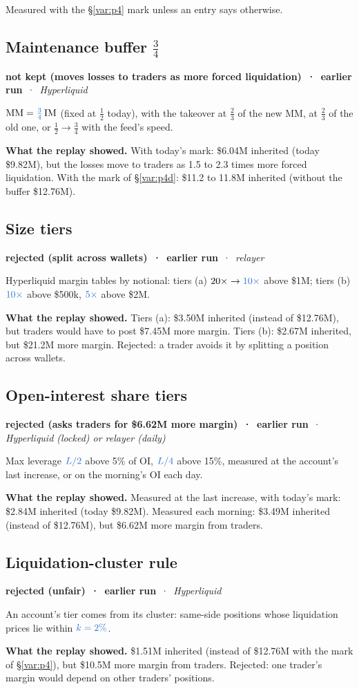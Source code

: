 \documentclass[10.5pt,a4paper]{article}
\newcommand{\chg}[1]{\ensuremath{{\color[HTML]{2F74D0}#1}}}
\newcommand{\st}[3]{\textcolor{#1}{\textbf{#2}} \,·\, \emph{#3}\par}
\newcommand{\res}[1]{\par\textbf{What the replay showed.} #1\par}
\begin{document}
Measured with the \S\ref{var:p4} mark unless an entry says otherwise.

\subsection{Maintenance buffer \texorpdfstring{$\tfrac34$}{3/4}}\label{var:auto7}
\st{sup}{not kept (moves losses to traders as more forced liquidation) \,·\, earlier run}{Hyperliquid}
$\text{MM} = \chg{\tfrac34}\,\text{IM}$ (fixed at $\tfrac12$ today), with the takeover at $\tfrac23$ of the new MM, at $\tfrac23$ of the old one, or $\tfrac12 \to \tfrac34$ with the feed's speed.
\res{With today's mark: \$6.04M inherited (today \$9.82M), but the losses move to traders as 1.5 to 2.3 times more forced liquidation. With the mark of \S\ref{var:p4d}: \$11.2 to 11.8M inherited (without the buffer \$12.76M).}

\subsection{Size tiers}\label{var:auto8}
\st{rej}{rejected (split across wallets) \,·\, earlier run}{relayer}
Hyperliquid margin tables by notional: tiers (a) $20\times \to \chg{10\times}$ above \$1M; tiers (b) $\chg{10\times}$ above \$500k, $\chg{5\times}$ above \$2M.
\res{Tiers (a): \$3.50M inherited (instead of \$12.76M), but traders would have to post \$7.45M more margin. Tiers (b): \$2.67M inherited, but \$21.2M more margin. Rejected: a trader avoids it by splitting a position across wallets.}

\subsection{Open-interest share tiers}\label{var:auto9}
\st{rej}{rejected (asks traders for \$6.62M more margin) \,·\, earlier run}{Hyperliquid (locked) or relayer (daily)}
Max leverage $\chg{L/2}$ above 5\% of OI, $\chg{L/4}$ above 15\%, measured at the account's last increase, or on the morning's OI each day.
\res{Measured at the last increase, with today's mark: \$2.84M inherited (today \$9.82M). Measured each morning: \$3.49M inherited (instead of \$12.76M), but \$6.62M more margin from traders.}

\subsection{Liquidation-cluster rule}\label{var:auto10}
\st{rej}{rejected (unfair) \,·\, earlier run}{Hyperliquid}
An account's tier comes from its cluster: same-side positions whose liquidation prices lie within $\chg{k = 2\%}$.
\res{\$1.51M inherited (instead of \$12.76M with the mark of \S\ref{var:p4}), but \$10.5M more margin from traders. Rejected: one trader's margin would depend on other traders' positions.}
\end{document}
